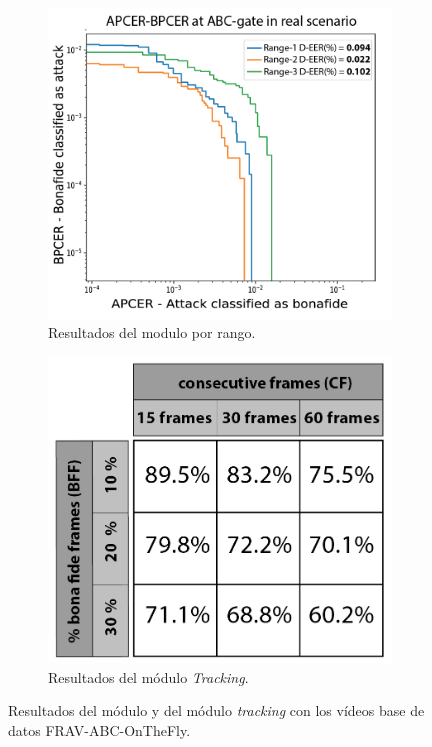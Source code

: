 \begin{figure}[t!]
    \centering
    \begin{subfigure}{.45\textwidth}
        \centering
        \includegraphics[width=1\linewidth]{ch-sistemasABC/images/ch-onthefly/APCER-BPCER-AT-DEVICE_b.png}
        \caption{Resultados del modulo  por rango.}
        \label{fig:pad-result-DATABASE}
    \end{subfigure}
    \begin{subfigure}{.45\textwidth}
        \centering
        \includegraphics[width=1\linewidth]{ch-sistemasABC/images/ch-onthefly/TRACKING-FRAV-ABC.png}
        \caption{Resultados del módulo \textit{Tracking}.}
        \label{fig:pad-result-REAL-SCENARIO}
    \end{subfigure}
    \caption{Resultados del módulo  y del módulo \textit{tracking} con los vídeos base de datos \Gls{FRAV-ABC-OnTheFly}.}
    \label{fig:ranges-APCER-BPCER-RESULT_OnTheFly}
\end{figure}

